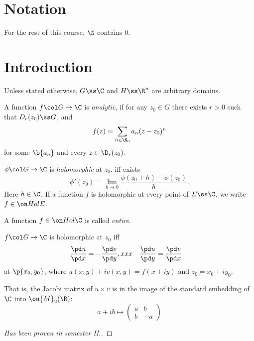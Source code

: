 \section{Notation}

For the rest of this course, $\N$ contains 0.

\section{Introduction}

\begin{definition}
  Unless stated otherwise, $G \ss \C$ and $H \ss \R^n$ are arbitrary domains.
\end{definition}

\begin{definition}
  A function $f \col G \to \C$ is \emph{analytic}, if for any $z_0 \in G$ there exists $r > 0$ such that $D_r(z_0) \ss G$, and
  $$ f(z) = \sum_{n \in \N_0} a_n (z - z_0)^n $$
  for some $\b{a_n}$ and every $z \in \D_r(z_0)$. 
\end{definition}

\begin{definition}
  $\phi \col G \to \C$ is \emph{holomorphic} at $z_0$, iff exists
  $$ \phi'(z_0) = \lim_{h \to 0} \frac{\phi(z_0+h)-\phi(z_0)}{h}. $$
  Here $h \in \C$.
  If a function $f$ is holomorphic at every point of $E \ss \C$, we write $f \in \Hol E$.
\end{definition}

\begin{definition}
  A function $f \in \Hol \C$ is called \emph{entire}.
\end{definition}

\begin{theorem}
  $f \col G \to \C$ is holomorphic at $z_0$ iff
  \begin{align*}
    \frac{\pd u}{\pd x} &= -\frac{\pd v}{\pd y}, x  x x&
    \frac{\pd u}{\pd y} &= \frac{\pd v}{\pd x}
  \end{align*}
  at $\p{x_0, y_0}$,
  where $u(x, y)+iv(x,y) = f(x+iy)$ and $z_0 = x_0+iy_0$.
\end{theorem}
That is, the Jacobi matrix of $u \times v$ is in the image of the standard embedding of $\C$ into $\on{M}_2(\R)$:
$$ a+ib \mapsto \begin{pmatrix}
  a & b \\
  b & -a
\end{pmatrix}
$$

\begin{proof}[Has been proven in semester II.]
\end{proof}

